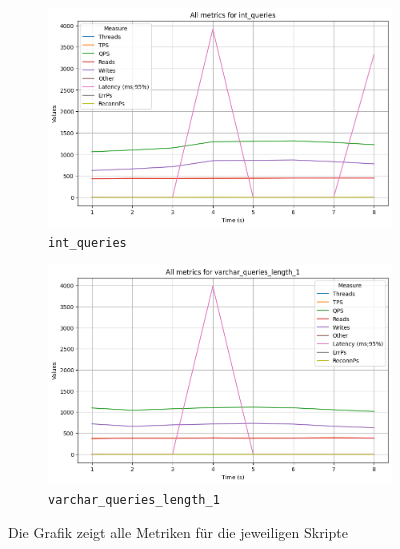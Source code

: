 \begin{figure}[H]
    \centering
    \begin{subfigure}[t]{0.48\textwidth}
        \centering
        \includegraphics[width=\textwidth]{PNGs/Join_Type/int_queries}
        \caption{\texttt{int\_queries}}
        \label{join-typ-int_queries}
    \end{subfigure}
    \hfill
    \begin{subfigure}[t]{0.48\textwidth}
        \centering
        \includegraphics[width=\textwidth]{PNGs/Join_Type/varchar_queries_length_1}
        \caption{\texttt{varchar\_queries\_length\_1}}
        \label{join-typ-varchar_queries_length_1}
    \end{subfigure}
    \caption[Join-Typ: Skriptvergleich]{Die Grafik zeigt alle Metriken für die jeweiligen Skripte}
    \label{fig:join-typ-comp-script}
\end{figure}
\vspace{-20pt}

